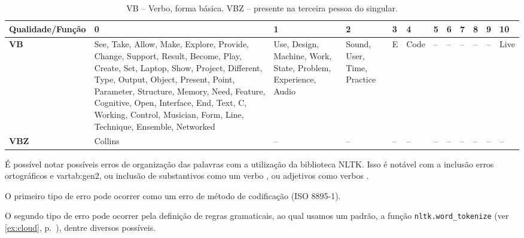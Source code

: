 \begin{table}
\centering
\caption{VB -- Verbo, forma básica. VBZ -- presente na terceira pessoa do singular.}
\label{tab:gen1}
\small
\begin{tabular}{ | p{2.6cm} | p{2.1cm} | p{2.1cm} | p{1.5cm} | p{0.5cm} | p{0.5cm} | p{0.25cm} | p{0.25cm} | p{0.25cm} | p{0.25cm} | p{0.25cm} | p{0.75cm} |}
\hline
\hline
\tiny \textbf{Qualidade/Função}
 & \textbf{0}
 & \textbf{1}
 & \textbf{2}
 & \textbf{3}
 & \textbf{4}
 & \textbf{5}
 & \textbf{6}
 & \textbf{7}
 & \textbf{8}
 & \textbf{9}
 & \textbf{10} \\ 
\hline
\hline
\tiny \textbf{VB} & \tiny See, Take, Allow, Make, Explore, Provide, Change, Support, Result, Become, Play, Create, Set, Laptop, Show, Project, Different, Type, Output, Object, Present, Point, Parameter, Structure, Memory, Need, Feature, Cognitive, Open, Interface, End, Text, C, Working, Control, Musician, Form, Line, Technique, Ensemble, Networked  & \tiny Use, Design, Machine, Work, State, Problem, Experience, Audio  & \tiny Sound, User, Time, Practice  & \tiny E  & \tiny Code  & \tiny --  & \tiny --  & \tiny --  & \tiny --  & \tiny --  & \tiny Live \\ 
\hline
\tiny \textbf{VBZ}
 & \tiny Collins  & \tiny --  & \tiny --  & \tiny --  & \tiny --  & \tiny --  & \tiny --  & \tiny --  & \tiny --  & \tiny --  & \tiny -- \\
 \hline
 \hline
\end{tabular}
\end{table}

É possível notar possíveis erros de organização das palavras com a utilização da biblioteca NLTK. Isso é notável com a inclusão erros ortográficos  e var{tab:gen2}, ou inclusão de substantivos como um verbo , ou adjetivos como verbos .

O primeiro tipo de erro pode ocorrer como um erro de método de codificação (ISO 8895-1). 
 
 O segundo tipo de erro pode ocorrer pela definição de regras gramaticais, ao qual usamos um padrão,  a função \verb|nltk.word_tokenize| (ver  \autoref{ex:cloud}, p.~\pageref{ex:cloud}), dentre diversos possíveis. 

